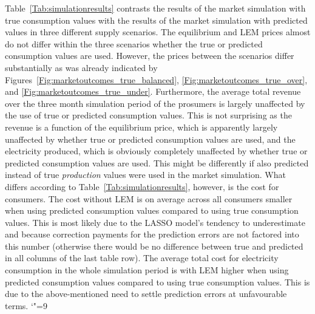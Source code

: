 Table~\ref{Tab:simulationresults} contrasts the results of the market simulation with true consumption values with the results of the market simulation with predicted values in three different supply scenarios. The equilibrium and LEM prices almost do not differ within the three scenarios whether the true or predicted consumption values are used. However, the prices between the scenarios differ substantially as was already indicated by Figures~\ref{Fig:marketoutcomes_true_balanced}, \ref{Fig:marketoutcomes_true_over}, and \ref{Fig:marketoutcomes_true_under}. Furthermore, the average total revenue over the three month simulation period of the prosumers is largely unaffected by the use of true or predicted consumption values. This is not surprising as the revenue is a function of the equilibrium price, which is apparently largely unaffected by whether true or predicted consumption values are used, and the electricity produced, which is obviously completely unaffected by whether true or predicted consumption values are used. This might be differently if also predicted instead of true \emph{production} values were used in the market simulation. What differs according to Table~\ref{Tab:simulationresults}, however, is the cost for consumers. The cost without LEM is on average across all consumers smaller when using predicted consumption values compared to using true consumption values. This is most likely due to the LASSO model's tendency to underestimate and because correction payments for the prediction errors are not factored into this number (otherwise there would be no difference between true and predicted in all columns of the last table row). The average total cost for electricity consumption in the whole simulation period is with LEM higher when using predicted consumption values compared to using true consumption values. This is due to the above-mentioned need to settle prediction errors at unfavourable terms.
%
\begingroup\catcode`"=9
